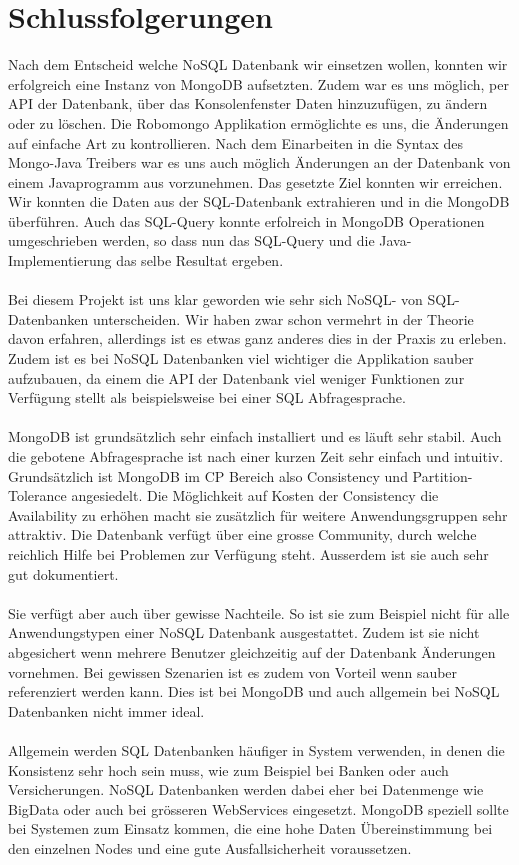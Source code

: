 \section{Schlussfolgerungen}
Nach dem Entscheid welche NoSQL Datenbank wir einsetzen wollen, konnten wir
erfolgreich eine Instanz von MongoDB aufsetzten. Zudem war es uns möglich, per
API der Datenbank, über das Konsolenfenster Daten hinzuzufügen, zu ändern oder
zu löschen. Die Robomongo\cite{Robomongo2016} Applikation ermöglichte es uns,
die Änderungen auf einfache Art zu kontrollieren. Nach dem Einarbeiten in die Syntax 
des Mongo-Java Treibers war es uns auch möglich Änderungen an der Datenbank von 
einem Javaprogramm aus vorzunehmen. Das gesetzte Ziel konnten wir erreichen.
Wir konnten die Daten aus der SQL-Datenbank extrahieren und in die MongoDB 
überführen. Auch das SQL-Query konnte erfolreich in MongoDB Operationen
umgeschrieben werden, so dass nun das SQL-Query und die Java-Implementierung
das selbe Resultat ergeben.
\\\\
Bei diesem Projekt ist uns klar geworden wie sehr sich NoSQL- von SQL-Datenbanken unterscheiden. 
Wir haben zwar schon vermehrt in der Theorie davon erfahren, allerdings ist es etwas ganz anderes dies 
in der Praxis zu erleben. Zudem ist es bei NoSQL Datenbanken viel wichtiger die Applikation sauber 
aufzubauen, da einem die API der Datenbank viel weniger Funktionen zur Verfügung stellt als beispielsweise 
bei einer SQL Abfragesprache. 
\\\\
MongoDB ist grundsätzlich sehr einfach installiert und es läuft sehr stabil. Auch die gebotene Abfragesprache 
ist nach einer kurzen Zeit sehr einfach und intuitiv. Grundsätzlich ist MongoDB im CP Bereich also Consistency 
und Partition-Tolerance angesiedelt. Die Möglichkeit auf Kosten der Consistency die Availability zu erhöhen 
macht sie zusätzlich für weitere Anwendungsgruppen sehr attraktiv. Die Datenbank verfügt über eine grosse 
Community, durch welche reichlich Hilfe bei Problemen zur Verfügung steht.
Ausserdem ist sie auch sehr gut dokumentiert.
\\\\
Sie verfügt aber auch über gewisse Nachteile. So ist sie zum Beispiel nicht für alle Anwendungstypen einer 
NoSQL Datenbank ausgestattet. Zudem ist sie nicht abgesichert wenn mehrere Benutzer gleichzeitig auf der 
Datenbank Änderungen vornehmen. Bei gewissen Szenarien ist es zudem von Vorteil wenn sauber referenziert 
werden kann. Dies ist bei MongoDB und auch allgemein bei NoSQL Datenbanken nicht immer ideal.
\\\\
Allgemein werden SQL Datenbanken häufiger in System verwenden, in denen die Konsistenz sehr hoch sein muss, 
wie zum Beispiel bei Banken oder auch Versicherungen. NoSQL Datenbanken werden dabei eher bei Datenmenge 
wie BigData oder auch bei grösseren WebServices eingesetzt. MongoDB speziell sollte bei Systemen zum Einsatz kommen, 
die eine hohe Daten Übereinstimmung bei den einzelnen Nodes und eine gute Ausfallsicherheit voraussetzen.

